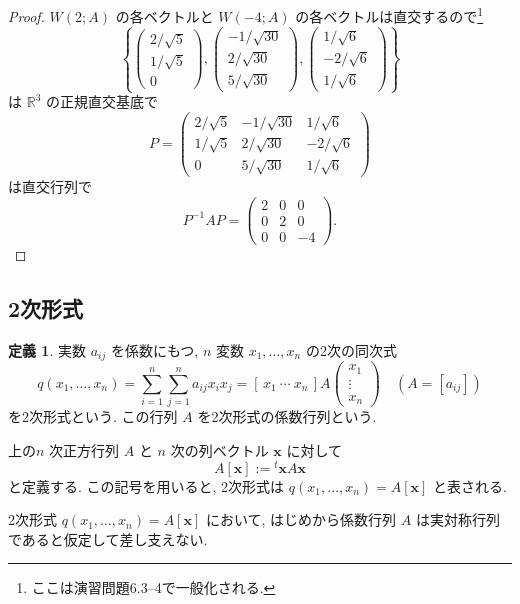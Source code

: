 \documentclass[dvipdfmx,a4paper,11pt]{article} %
\theoremstyle{definition}
\newtheorem{defn}[thm]{定義}
\begin{document}
\begin{proof}
$W(2;A)$ の各ベクトルと $W(-4;A)$ の各ベクトルは直交するので\footnote{ここは演習問題6.3--4で一般化される. }
\[
\left\{
\begin{pmatrix}
2/\sqrt{5}\\
1/\sqrt{5}\\
0
\end{pmatrix},
\begin{pmatrix}
-1/\sqrt{30}\\
2/\sqrt{30}\\
5/\sqrt{30}
\end{pmatrix},
\begin{pmatrix}
1/\sqrt{6}\\
-2/\sqrt{6}\\
1/\sqrt{6}
\end{pmatrix}
\right\}
\]
は $\mathbb{R}^3$ の正規直交基底で
\[
P=
\begin{pmatrix}
2/\sqrt{5}&-1/\sqrt{30}&1/\sqrt{6}\\
1/\sqrt{5}&2/\sqrt{30}&-2/\sqrt{6}\\
0&5/\sqrt{30}&1/\sqrt{6}
\end{pmatrix}
\]
は直交行列で
\[
P^{-1}AP=
\begin{pmatrix}
2&0&0\\
0&2&0\\
0&0&-4
\end{pmatrix}.
\]
\end{proof}

\subsection{2次形式 \cite[6.4節]{M}}

\begingroup{}
\begin{defn}
実数 $a_{ij}$ を係数にもつ, $n$ 変数 $x_1,\ldots,x_n$ の2次の同次式
\[
q(x_1,\ldots,x_n)
=
\sum_{i=1}^{n}\sum_{j=1}^{n}a_{ij}x_ix_j
=
[\,x_1\ \cdots\ x_n\,]
A
\begin{pmatrix}
x_1\\
\vdots\\
x_n
\end{pmatrix}
\quad
(A=[a_{ij}])
\]
を2次形式という. この行列 $A$ を2次形式の係数行列という.

上の$n$ 次正方行列 $A$ と $n$ 次の列ベクトル $\bm{x}$ に対して
\[
A[\bm{x}]:={}^{t}\!\bm{x}A\bm{x}
\]
と定義する. この記号を用いると, 2次形式は
\(
q(x_1,\ldots,x_n)=A[\bm{x}]
\)
と表される.
\end{defn}
\endgroup
2次形式 $q(x_1,\ldots,x_n)=A[\bm{x}]$ において, はじめから係数行列 $A$ は実対称行列であると仮定して差し支えない.
\end{document}
